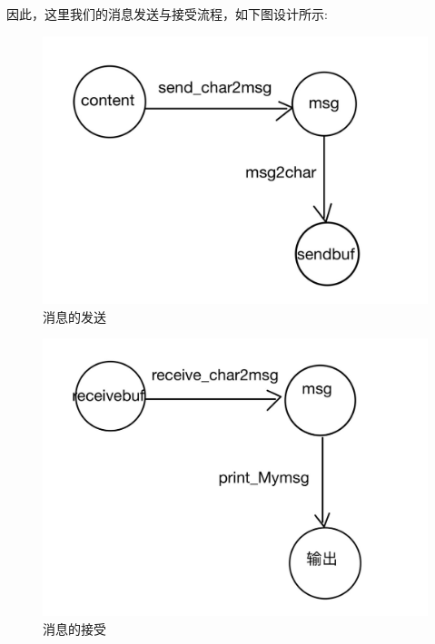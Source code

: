 \documentclass[12pt]{article}
\begin{document}
因此，这里我们的消息发送与接受流程，如下图设计所示:
\begin{table}[!htbp]
    \centering
        \begin{minipage}{0.45\linewidth}
        \begin{figure}[H]
        \centering
        \includegraphics[scale=0.15]{fig/2.png}
        \caption{消息的发送}
       \label{fig:4}
\end{figure}
    \end{minipage}
\hfill
\begin{minipage}{0.45\linewidth}
\centering
       \begin{figure}[H]
        \centering
        \includegraphics[scale=0.15]{fig/1.png}
        \caption{消息的接受}
       \label{fig:5}
\end{figure}
    \end{minipage}
\end{table}
\end{document}
